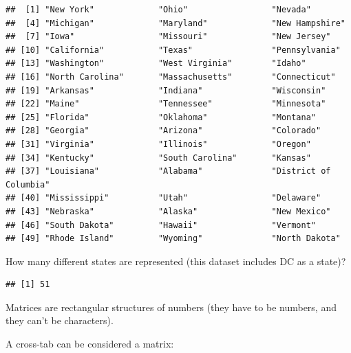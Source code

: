 \documentclass[]{book}
\newenvironment{Shaded}{\begin{snugshade}}{\end{snugshade}}
\newcommand{\KeywordTok}[1]{\textcolor[rgb]{0.13,0.29,0.53}{\textbf{#1}}}
\newcommand{\NormalTok}[1]{#1}
\newcommand{\OperatorTok}[1]{\textcolor[rgb]{0.81,0.36,0.00}{\textbf{#1}}}
\theoremstyle{definition}
\theoremstyle{definition}
\theoremstyle{definition}
\theoremstyle{remark}
\begin{document}
\begin{verbatim}
##  [1] "New York"             "Ohio"                 "Nevada"              
##  [4] "Michigan"             "Maryland"             "New Hampshire"       
##  [7] "Iowa"                 "Missouri"             "New Jersey"          
## [10] "California"           "Texas"                "Pennsylvania"        
## [13] "Washington"           "West Virginia"        "Idaho"               
## [16] "North Carolina"       "Massachusetts"        "Connecticut"         
## [19] "Arkansas"             "Indiana"              "Wisconsin"           
## [22] "Maine"                "Tennessee"            "Minnesota"           
## [25] "Florida"              "Oklahoma"             "Montana"             
## [28] "Georgia"              "Arizona"              "Colorado"            
## [31] "Virginia"             "Illinois"             "Oregon"              
## [34] "Kentucky"             "South Carolina"       "Kansas"              
## [37] "Louisiana"            "Alabama"              "District of Columbia"
## [40] "Mississippi"          "Utah"                 "Delaware"            
## [43] "Nebraska"             "Alaska"               "New Mexico"          
## [46] "South Dakota"         "Hawaii"               "Vermont"             
## [49] "Rhode Island"         "Wyoming"              "North Dakota"
\end{verbatim}

How many different states are represented (this dataset includes DC as a state)?

\begin{Shaded}
\end{Shaded}

\begin{verbatim}
## [1] 51
\end{verbatim}

Matrices are rectangular structures of numbers (they have to be numbers, and they can't be characters).

A cross-tab can be considered a matrix:

\begin{Shaded}
\end{Shaded}
\end{document}
